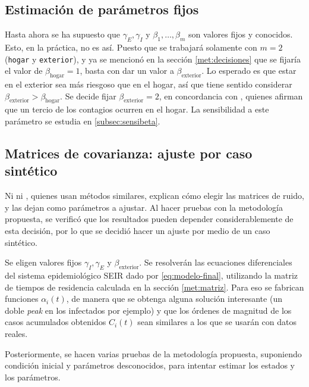 \subsection{Estimación de parámetros fijos}
Hasta ahora se ha supuesto que \(\gamma_E, \gamma_I\) y \(\beta_1, \dots, \beta_m\) son valores fijos y conocidos. Esto, en la práctica, no es así. Puesto que se trabajará solamente con \(m= 2\) (\texttt{hogar} y \texttt{exterior}), y ya se mencionó en la sección \ref{met:decisiones} que se fijaría el valor de \(\beta_{\text{hogar}} = 1\), basta con dar un valor a \(\beta_{\text{exterior}}\). Lo esperado es que estar en el exterior sea más riesgoso que en el hogar, así que tiene sentido considerar \(\beta_{\text{exterior}} > \beta_{\text{hogar}}\). Se decide fijar \(\beta_{\text{exterior}} = 2\), en concordancia con \cite{Ferguson2020}\cite{}, quienes afirman que un tercio de los contagios ocurren en el hogar. La sensibilidad a este parámetro se estudia en \ref{subsec:sensibeta}.


\subsection{Matrices de covarianza: ajuste por caso sintético}

Ni \cite{Hasan2020} ni \cite{Sameni2020}, quienes usan métodos similares, explican cómo elegir las matrices de ruido, y las dejan como parámetros a ajustar. Al hacer pruebas con la metodología propuesta, se verificó que los resultados pueden depender considerablemente de esta decisión, por lo que se decidió hacer un ajuste por medio de un caso sintético.


Se eligen valores fijos \(\gamma_I, \gamma_E\) y \(\beta_{\text{exterior}}\). Se resolverán las ecuaciones diferenciales del sistema epidemiológico SEIR dado por \ref{eq:modelo-final}, utilizando la matriz de tiempos de residencia calculada en la sección \ref{met:matriz}. Para eso se fabrican funciones \(\alpha_i(t)\), de manera que se obtenga alguna solución interesante (un doble \textit{peak} en los infectados por ejemplo) y que los órdenes de magnitud de los casos acumulados obtenidos \(C_i(t)\) sean similares a los que se usarán con datos reales.

Posteriormente, se hacen varias pruebas de la metodología propuesta, suponiendo condición inicial y parámetros desconocidos, para intentar estimar los estados y los parámetros. 



